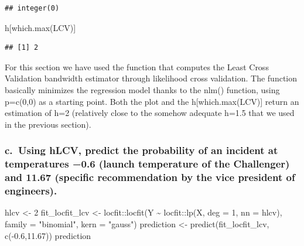 \documentclass[
]{article}
\newenvironment{Shaded}{\begin{snugshade}}{\end{snugshade}}
\newcommand{\AttributeTok}[1]{\textcolor[rgb]{0.77,0.63,0.00}{#1}}
\newcommand{\DecValTok}[1]{\textcolor[rgb]{0.00,0.00,0.81}{#1}}
\newcommand{\FloatTok}[1]{\textcolor[rgb]{0.00,0.00,0.81}{#1}}
\newcommand{\FunctionTok}[1]{\textcolor[rgb]{0.00,0.00,0.00}{#1}}
\newcommand{\NormalTok}[1]{#1}
\newcommand{\OtherTok}[1]{\textcolor[rgb]{0.56,0.35,0.01}{#1}}
\newcommand{\SpecialCharTok}[1]{\textcolor[rgb]{0.00,0.00,0.00}{#1}}
\newcommand{\StringTok}[1]{\textcolor[rgb]{0.31,0.60,0.02}{#1}}
\begin{document}
\begin{verbatim}
## integer(0)
\end{verbatim}

\begin{Shaded}
\begin{Highlighting}[]
\NormalTok{h[}\FunctionTok{which.max}\NormalTok{(LCV)]}
\end{Highlighting}
\end{Shaded}

\begin{verbatim}
## [1] 2
\end{verbatim}

For this section we have used the function that computes the Least Cross
Validation bandwidth estimator through likelihood cross validation. The
function basically minimizes the regression model thanks to the nlm()
function, using p=c(0,0) as a starting point. Both the plot and the
h{[}which.max(LCV){]} return an estimation of h=2 (relatively close to
the somehow adequate h=1.5 that we used in the previous section).

\hypertarget{c.-using-hlcv-predict-the-probability-of-an-incident-at-temperatures-0.6-launch-temperature-of-the-challenger-and-11.67-specific-recommendation-by-the-vice-president-of-engineers.}{%
\subsubsection{c.~Using hLCV, predict the probability of an incident at
temperatures −0.6 (launch temperature of the Challenger) and 11.67
(specific recommendation by the vice president of
engineers).}\label{c.-using-hlcv-predict-the-probability-of-an-incident-at-temperatures-0.6-launch-temperature-of-the-challenger-and-11.67-specific-recommendation-by-the-vice-president-of-engineers.}}

\begin{Shaded}
\begin{Highlighting}[]
\NormalTok{hlcv }\OtherTok{\textless{}{-}} \DecValTok{2}
\NormalTok{fit\_locfit\_lcv }\OtherTok{\textless{}{-}}\NormalTok{ locfit}\SpecialCharTok{::}\FunctionTok{locfit}\NormalTok{(Y }\SpecialCharTok{\textasciitilde{}}\NormalTok{ locfit}\SpecialCharTok{::}\FunctionTok{lp}\NormalTok{(X, }\AttributeTok{deg =} \DecValTok{1}\NormalTok{, }\AttributeTok{nn =}\NormalTok{ hlcv),}
                             \AttributeTok{family =} \StringTok{"binomial"}\NormalTok{, }\AttributeTok{kern =} \StringTok{"gauss"}\NormalTok{)}
\NormalTok{prediction }\OtherTok{\textless{}{-}} \FunctionTok{predict}\NormalTok{(fit\_locfit\_lcv, }\FunctionTok{c}\NormalTok{(}\SpecialCharTok{{-}}\FloatTok{0.6}\NormalTok{,}\FloatTok{11.67}\NormalTok{))}
\NormalTok{prediction}
\end{Highlighting}
\end{Shaded}
\end{document}
